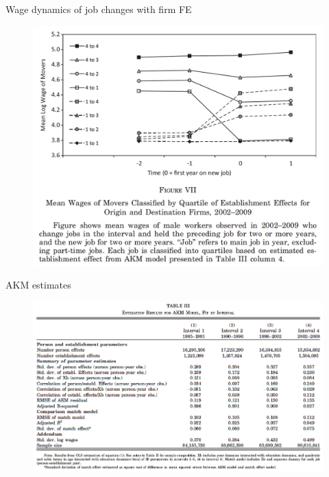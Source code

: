 \documentclass[notes=show]{beamer}
\begin{document}
\begin{frame}{Wage dynamics of job changes with firm FE}
\begin{figure}[p!]
 \includegraphics[width=.9\textwidth]{figures/Fig7.png} 
\end{figure}
\end{frame}

\begin{frame}{AKM estimates}
\begin{figure}[p!]
 \includegraphics[width=\textwidth]{figures/Table3} 
\end{figure}
\end{frame}
\end{document}
